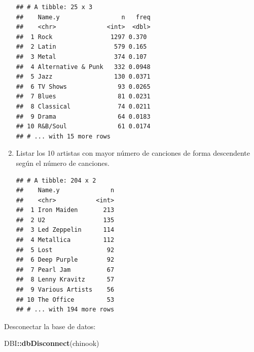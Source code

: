 \documentclass[
]{book}
\newenvironment{Shaded}{\begin{snugshade}}{\end{snugshade}}
\newcommand{\DataTypeTok}[1]{\textcolor[rgb]{0.13,0.29,0.53}{#1}}
\newcommand{\KeywordTok}[1]{\textcolor[rgb]{0.13,0.29,0.53}{\textbf{#1}}}
\newcommand{\NormalTok}[1]{#1}
\newcommand{\OperatorTok}[1]{\textcolor[rgb]{0.81,0.36,0.00}{\textbf{#1}}}
\newcommand{\StringTok}[1]{\textcolor[rgb]{0.31,0.60,0.02}{#1}}
\begin{document}
\begin{enumerate}
\begin{verbatim}
## # A tibble: 25 x 3
##    Name.y                 n   freq
##    <chr>              <int>  <dbl>
##  1 Rock                1297 0.370 
##  2 Latin                579 0.165 
##  3 Metal                374 0.107 
##  4 Alternative & Punk   332 0.0948
##  5 Jazz                 130 0.0371
##  6 TV Shows              93 0.0265
##  7 Blues                 81 0.0231
##  8 Classical             74 0.0211
##  9 Drama                 64 0.0183
## 10 R&B/Soul              61 0.0174
## # ... with 15 more rows
\end{verbatim}
\item
  Listar los 10 artistas con mayor número de canciones
  de forma descendente según el número de canciones.

\begin{Shaded}
\end{Shaded}

\begin{verbatim}
## # A tibble: 204 x 2
##    Name.y              n
##    <chr>           <int>
##  1 Iron Maiden       213
##  2 U2                135
##  3 Led Zeppelin      114
##  4 Metallica         112
##  5 Lost               92
##  6 Deep Purple        92
##  7 Pearl Jam          67
##  8 Lenny Kravitz      57
##  9 Various Artists    56
## 10 The Office         53
## # ... with 194 more rows
\end{verbatim}
\end{enumerate}

Desconectar la base de datos:

\begin{Shaded}
\begin{Highlighting}[]
\NormalTok{DBI}\OperatorTok{::}\KeywordTok{dbDisconnect}\NormalTok{(chinook)            }
\end{Highlighting}
\end{Shaded}
\end{document}
